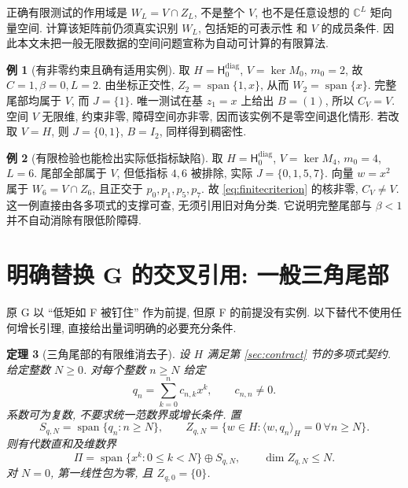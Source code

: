 \documentclass[UTF8,11pt]{ctexart}
\newtheorem{theorem}{定理}[section]
\theoremstyle{definition}
\newtheorem{example}[theorem]{例}
\DeclareMathOperator{\Span}{span}
\newcommand{\ip}[2]{\langle #1,#2\rangle_H}
\newcommand{\Hd}[1]{\mathsf H_{#1}^{\mathrm{diag}}}
\begin{document}
正确有限测试的作用域是 $W_L=V\cap Z_L$, 不是整个 $V$, 也不是任意设想的
$\mathbb C^L$ 矩向量空间. 计算该矩阵前仍须真实识别 $W_L$, 包括矩的可表示性
和 $V$ 的成员条件. 因此本文未把一般无限数据的空间问题宣称为自动可计算的有限算法.

\begin{example}[有非零约束且确有适用实例]\label{ex:usable}
取 $H=\Hd0$, $V=\ker M_0$, $m_0=2$, 故 $C=1,\beta=0,L=2$.
由坐标正交性, $Z_2=\Span\{1,x\}$, 从而 $W_2=\Span\{x\}$.
完整尾部均属于 $V$, 而 $J=\{1\}$.
唯一测试在基 $z_1=x$ 上给出 $B=(1)$, 所以 $C_V=V$.
空间 $V$ 无限维, 约束非零, 障碍空间亦非零, 因而该实例不是零空间退化情形.
若改取 $V=H$, 则 $J=\{0,1\}$, $B=I_2$, 同样得到稠密性.
\end{example}

\begin{example}[有限检验也能检出实际低指标缺陷]\label{ex:lowfailure}
取 $H=\Hd0$, $V=\ker M_4$, $m_0=4$, $L=6$.
尾部全部属于 $V$, 但低指标 $4,6$ 被排除, 实际 $J=\{0,1,5,7\}$.
向量 $w=x^2$ 属于 $W_6=V\cap Z_6$, 且正交于 $p_0,p_1,p_5,p_7$.
故 \eqref{eq:finitecriterion} 的核非零, $C_V\ne V$.
这一例直接由各多项式的支撑可查, 无须引用旧对角分类.
它说明完整尾部与 $\beta<1$ 并不自动消除有限低阶障碍.
\end{example}

\section{明确替换 G 的交叉引用: 一般三角尾部}\label{sec:triangular}

原 G 以 ``低矩如 F 被钉住'' 作为前提, 但原 F 的前提没有实例.
以下替代不使用任何增长引理, 直接给出量词明确的必要充分条件.

\begin{theorem}[三角尾部的有限维消去子]\label{thm:triangular}
设 $H$ 满足第 \ref{sec:contract} 节的多项式契约.
给定整数 $N\geq0$. 对\emph{每个}整数 $n\geq N$ 给定
\begin{equation}\label{eq:qn}
 q_n=\sum_{k=0}^n c_{n,k}x^k,\qquad c_{n,n}\ne0.
\end{equation}
系数可为复数, 不要求统一范数界或增长条件. 置
\[
 S_{q,N}=\Span\{q_n:n\geq N\},\qquad
 Z_{q,N}=\{w\in H:\ip{w}{q_n}=0\ \forall n\geq N\}.
\]
则有代数直和及维数界
\begin{equation}\label{eq:qdecomp}
 \Pi=\Span\{x^k:0\leq k<N\}\mathbin{\oplus}S_{q,N},\qquad
 \dim Z_{q,N}\leq N.
\end{equation}
对 $N=0$, 第一线性包为零, 且 $Z_{q,0}=\{0\}$.
\end{theorem}
\end{document}
